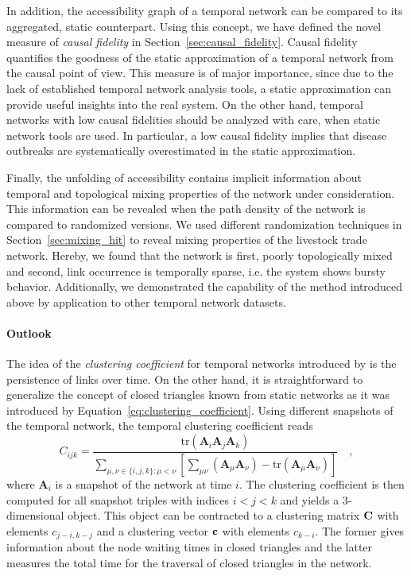 In addition, the accessibility graph of a temporal network can be compared to its aggregated, static counterpart.
Using this concept, we have defined the novel measure of \emph{causal fidelity} in Section~\ref{sec:causal_fidelity}.
Causal fidelity quantifies the goodness of the static approximation of a temporal network from the causal point of view.
This measure is of major importance, since due to the lack of established temporal network analysis tools, a static approximation can provide useful insights into the real system.
On the other hand, temporal networks with low causal fidelities should be analyzed with care, when static network tools are used.
In particular, a low causal fidelity implies that disease outbreaks are systematically overestimated in the static approximation.

Finally, the unfolding of accessibility contains implicit information about temporal and topological mixing properties of the network under consideration.
This information can be revealed when the path density of the network is compared to randomized versions.
We used different randomization techniques in Section~\ref{sec:mixing_hit} to reveal mixing properties of the livestock trade network.
Hereby, we found that the network is first, poorly topologically mixed and second, link occurrence is temporally sparse, i.e. the system shows bursty behavior.
Additionally, we demonstrated the capability of the method introduced above by application to other temporal network datasets.


\paragraph{Outlook\color{Cayenne}{.}}
The idea of the \emph{clustering coefficient} for temporal networks introduced by \citet{Tang:2010dn} is the persistence of links over time.
On the other hand, it is straightforward to generalize the concept of closed triangles known from static networks as it was introduced by Equation~\eqref{eq:clustering_coefficient}.
Using different snapshots of the temporal network, the temporal clustering coefficient reads
\[
C_{ijk}=\frac{\text{tr} (\mathbf{A}_{i}\mathbf{A}_{j}\mathbf{A}_{k})}{\sum_{\mu,\nu\in\{i,j,k\}:\mu<\nu}\left[\sum _{\mu \nu }\left(\mathbf{A}_{\mu}\mathbf{A}_{\nu}\right)-\text{tr}\left(\mathbf{A}_{\mu}\mathbf{A}_{\nu}\right)\right]} \quad ,
\]
where $\mathbf{A}_i$ is a snapshot of the network at time $i$.
The clustering coefficient is then computed for all snapshot triples with indices $i<j<k$ and yields a 3-dimensional object.
This object can be contracted to a clustering matrix $\mathbf{C}$ with elements $c_{j-i,k-j}$ and a clustering vector $\mathbf{c}$ with elements $c_{k-i}$.
The former gives information about the node waiting times in closed triangles and the latter measures the total time for the traversal of closed triangles in the network.

